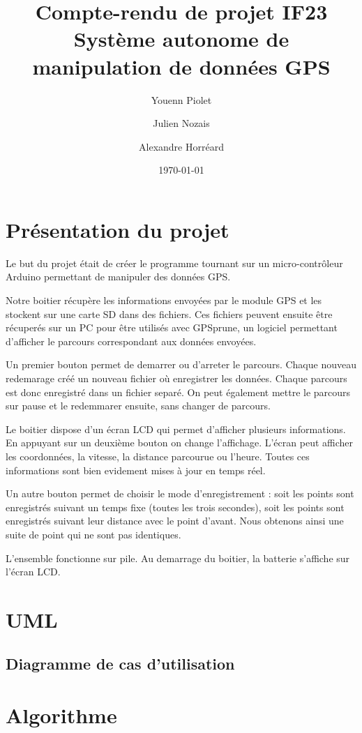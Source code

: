 \documentclass[a4paper,12pt,titlepage]{article}
\title{Compte-rendu de projet IF23\\Système autonome de manipulation de données GPS}
\author{Youenn Piolet \and Julien Nozais \and Alexandre Horréard}
\date{\today} %
\begin{document}
\maketitle

\newpage

\section{Présentation du projet}

Le but du projet était de créer le programme tournant sur un micro-contrôleur Arduino permettant de manipuler des données GPS.

Notre boitier récupère les informations envoyées par le module GPS et les stockent sur une carte SD dans des fichiers. 
Ces fichiers peuvent ensuite être récuperés sur un PC pour être utilisés avec GPSprune, un logiciel permettant d'afficher
le parcours correspondant aux données envoyées.

Un premier bouton permet de demarrer ou d'arreter le parcours. Chaque nouveau redemarage créé un nouveau fichier où enregistrer les données.
Chaque parcours est donc enregistré dans un fichier separé. On peut également mettre le parcours sur pause et le redemmarer ensuite, sans changer de parcours.

Le boitier dispose d'un écran LCD qui permet d'afficher plusieurs informations. En appuyant sur un deuxième bouton on change l'affichage.
L'écran peut afficher les coordonnées, la vitesse, la distance parcourue ou l'heure. Toutes ces informations sont bien evidement mises à jour en temps réel.

Un autre bouton permet de choisir le mode d'enregistrement : soit les points sont enregistrés suivant un temps fixe (toutes les trois secondes),
soit les points sont enregistrés suivant leur distance avec le point d'avant. Nous obtenons ainsi une suite de point qui ne sont pas identiques.

L'ensemble fonctionne sur pile. Au demarrage du boitier, la batterie s'affiche sur l'écran LCD.


\section{UML}

\subsection{Diagramme de cas d'utilisation}

\section{Algorithme}
\end{document}
